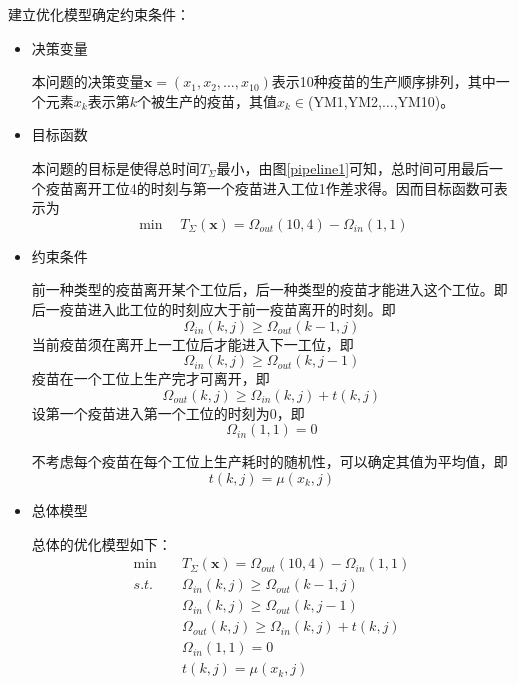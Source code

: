 \documentclass[UTF8]{ctexart}
\begin{document}
	建立优化模型确定约束条件：
	\begin{itemize}
		\item 决策变量 
		\par 本问题的决策变量$\boldsymbol{x}=(x_{1},x_{2},\dots,x_{10})$表示10种疫苗的生产顺序排列，其中一个元素$x_{k}$表示第$k$个被生产的疫苗，其值$x_{k}\in$(YM1,YM2,$\dots$,YM10)。
		\item 目标函数
		\par 本问题的目标是使得总时间$T_{\Sigma}$最小，由图\ref{pipeline1}可知，总时间可用最后一个疫苗离开工位4的时刻与第一个疫苗进入工位1作差求得。因而目标函数可表示为
		\begin{equation}
			\min \quad T_{\Sigma}(\boldsymbol{x})=\Omega_{out}(10,4)-\Omega_{in}(1,1)
		\end{equation}
		\item 约束条件
		\par 前一种类型的疫苗离开某个工位后，后一种类型的疫苗才能进入这个工位。即后一疫苗进入此工位的时刻应大于前一疫苗离开的时刻。即
	\begin{equation}
		\Omega_{in}(k,j)\geqslant\Omega_{out}(k-1,j)
	\end{equation}
	当前疫苗须在离开上一工位后才能进入下一工位，即
	\begin{equation}
		\Omega_{in}(k,j)\geqslant\Omega_{out}(k,j-1)
	\end{equation}
	疫苗在一个工位上生产完才可离开，即
	\begin{equation}
		\Omega_{out}(k,j)\geqslant\Omega_{in}(k,j)+t(k,j)
	\end{equation}
	设第一个疫苗进入第一个工位的时刻为0，即
	\begin{equation}
		\Omega_{in}(1,1)=0
		\label{eq0}
	\end{equation}

	不考虑每个疫苗在每个工位上生产耗时的随机性，可以确定其值为平均值，即
	\begin{equation}
		t(k,j)=\mu(x_{k},j)
		\label{eq1}
	\end{equation}
		


	\item 总体模型
	\par 总体的优化模型如下：
	\begin{equation}
		\begin{split}
		\min \quad&T_{\Sigma}(\boldsymbol{x})=\Omega_{out}(10,4)-\Omega_{in}(1,1)\\
		s.t. \quad &\Omega_{in}(k,j)\geqslant\Omega_{out}(k-1,j)\\
		&\Omega_{in}(k,j)\geqslant\Omega_{out}(k,j-1)\\
		&\Omega_{out}(k,j)\geqslant\Omega_{in}(k,j)+t(k,j)\\
		&\Omega_{in}(1,1)=0\\
		&t(k,j)=\mu(x_{k},j)
		\end{split}
	\end{equation}

	\end{itemize}
\end{document}
